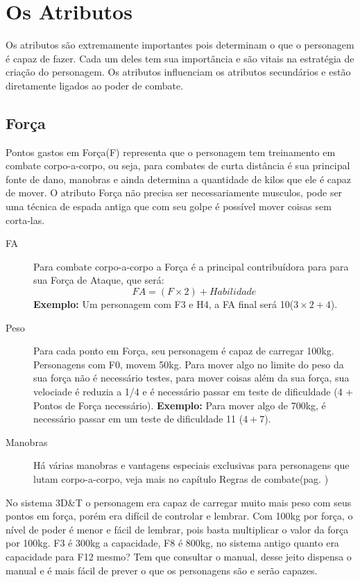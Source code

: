 \chapter{Os Atributos}
\label{ch:attributes}

Os atributos são extremamente importantes pois determinam o que o personagem é capaz de fazer. Cada um deles tem sua importância e são vitais na estratégia de criação do personagem. Os atributos influenciam os atributos secundários e estão diretamente ligados ao poder de combate. 

\section{Força}

Pontos gastos em Força(F) representa que o personagem tem treinamento em combate corpo-a-corpo, ou seja, para combates de curta distância é sua principal fonte de dano, manobras e ainda determina a quantidade de kilos que ele é capaz de mover. O atributo Força não precisa ser necessariamente musculos, pode ser uma técnica de espada antiga que com seu golpe é possível mover coisas sem corta-las.

\begin{description}
\item[FA] Para combate corpo-a-corpo a Força é a principal contribuídora para para sua Força de Ataque, que será: 
\[ FA = (F \times 2) + Habilidade \]
{\bf Exemplo:} Um personagem com F3 e H4, a FA final será 10(\(3 \times 2 + 4 \)). 
\item[Peso] Para cada ponto em Força, seu personagem é capaz de carregar 100kg. Personagens com F0, movem 50kg. Para mover algo no limite do peso da sua força não é necessário testes, para mover coisas além da sua força, sua velociade é reduzia a 1/4 e é necessário passar em teste de dificuldade (4 + Pontos de Força necessário). {\bf Exemplo:} Para mover algo de 700kg, é necessário passar em um teste de dificuldade 11 (\(4 + 7\)).
\item[Manobras] Há várias manobras e vantagens especiais exclusivas para personagens que lutam corpo-a-corpo, veja mais no capítulo Regras de combate(pag. \pageref{ch:combat})
\end{description}

\begin{framed}
No sistema 3D\&T o personagem era capaz de carregar muito mais peso com seus pontos em força, porém era difícil de controlar e lembrar. Com 100kg por força, o nível de poder é menor e fácil de lembrar, pois basta multiplicar o valor da força por 100kg. F3 é 300kg a capacidade, F8 é 800kg, no sistema antigo quanto era capacidade para F12 mesmo? Tem que consultar o manual, desse jeito dispensa o manual e é mais fácil de prever o que os personagens são e serão capazes.
\end{framed}

